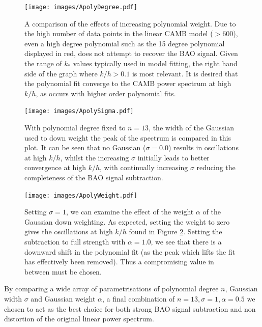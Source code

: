 \documentclass[titlesmallcaps, examinerscopy, copyrightpage]{uqthesis}
\begin{document}
\begin{appendices}
\begin{figure}[h]
  \begin{center}
    \texttt{[image: images/ApolyDegree.pdf]}
  	\caption{A comparison of the effects of increasing polynomial weight. Due to the high number of data points in the linear CAMB model ($>600$), even a high degree polynomial such as the 15 degree polynomial displayed in red, does not attempt to recover the BAO signal. Given the range of $k_*$ values typically used in model fitting, the right hand side of the graph where $k/h > 0.1$ is most relevant. It is desired that the polynomial fit converge to the CAMB power spectrum at high $k/h$, as occurs with higher order polynomial fits.}
  	\label{fig:ApolyDegree}
  \end{center}
\end{figure}

\begin{figure}[h]
  \begin{center}
    \texttt{[image: images/ApolySigma.pdf]}
  	\caption{With polynomial degree fixed to $n = 13$, the width of the Gaussian used to down weight the peak of the spectrum is compared in this plot. It can be seen that no Gaussian ($\sigma= 0.0$) results in oscillations at high $k/h$, whilst the increasing $\sigma$ initially leads to better convergence at high $k/h$, with continually increasing $\sigma$ reducing the completeness of the BAO signal subtraction.}
  	\label{fig:ApolySigma}
  \end{center}
\end{figure}

\begin{figure}[h]
  \begin{center}
    \texttt{[image: images/ApolyWeight.pdf]}
  	\caption{Setting $\sigma = 1$, we can examine the effect of the weight $\alpha$ of the Gaussian down weighting. As expected, setting the weight to zero gives the oscillations at high $k/h$ found in Figure \ref{fig:ApolySigma}. Setting the subtraction to full strength with $\alpha = 1.0$, we see that there is a downward shift in the polynomial fit (as the peak which lifts the fit has effectively been removed). Thus a compromising value in between must be chosen.}
  	\label{fig:ApolyWeight}
  \end{center}
\end{figure}


By comparing a wide array of parametrisations of polynomial degree $n$, Gaussian width $\sigma$ and Gaussian weight $\alpha$, a final combination of $n=13, \sigma=1, \alpha=0.5$ we chosen to act as the best choice for both strong BAO signal subtraction and non distortion of the original linear power spectrum.


\end{appendices}
\end{document}
